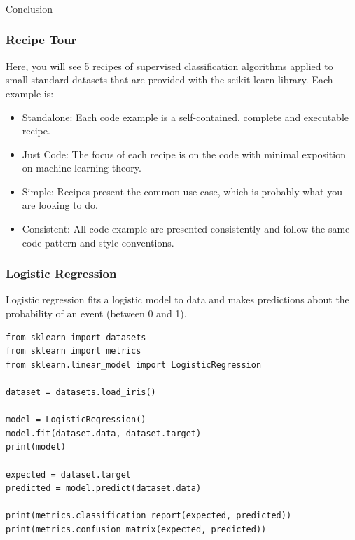 \begin{frame}[fragile]\frametitle{}
\begin{center}
{\Large Conclusion}
\end{center}
\end{frame}



\begin{frame}[fragile]\frametitle{Recipe Tour}
Here, you will see 5 recipes of supervised classification algorithms applied to small standard datasets that are provided with the scikit-learn library. Each example is:
\begin{itemize}
\item Standalone: Each code example is a self-contained, complete and executable recipe.
\item Just Code: The focus of each recipe is on the code with minimal exposition on machine learning theory.
\item Simple: Recipes present the common use case, which is probably what you are looking to do.
\item Consistent: All code example are presented consistently and follow the same code pattern and style conventions.
\end{itemize}
\end{frame}

\begin{frame}[fragile]\frametitle{Logistic Regression}
Logistic regression fits a logistic model to data and makes predictions about the probability of an event (between 0 and 1). 
\begin{lstlisting}
from sklearn import datasets
from sklearn import metrics
from sklearn.linear_model import LogisticRegression

dataset = datasets.load_iris()

model = LogisticRegression()
model.fit(dataset.data, dataset.target)
print(model)

expected = dataset.target
predicted = model.predict(dataset.data)

print(metrics.classification_report(expected, predicted))
print(metrics.confusion_matrix(expected, predicted))
\end{lstlisting}
\end{frame}

